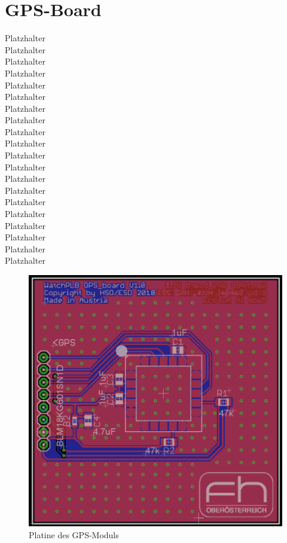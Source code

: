 \documentclass[a4paper]{scrartcl}
\begin{document}
\section{GPS-Board}

Platzhalter\\Platzhalter\\Platzhalter\\Platzhalter\\Platzhalter\\
Platzhalter\\Platzhalter\\Platzhalter\\Platzhalter\\Platzhalter\\
Platzhalter\\Platzhalter\\Platzhalter\\Platzhalter\\Platzhalter\\
Platzhalter\\Platzhalter\\Platzhalter\\Platzhalter\\Platzhalter\\

\begin{figure}[H]\centering
\includegraphics[page=1, angle=0, scale=0.4]{../Documentation/pics/gpsboard.png}
\caption{Platine des GPS-Moduls}
\end{figure}
\end{document}

